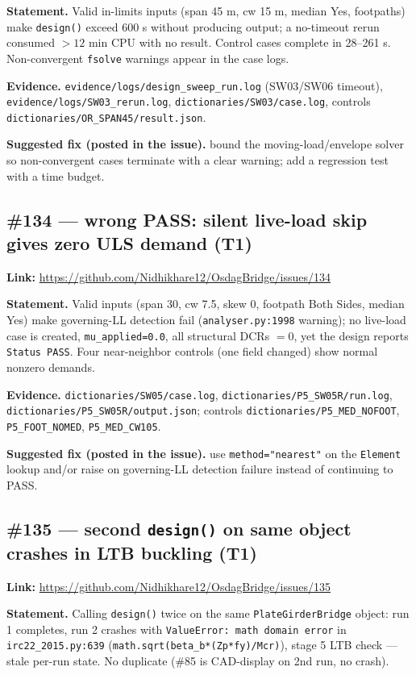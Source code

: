 \textbf{Statement.} Valid in-limits inputs (span 45 m, cw 15 m, median Yes, footpaths) make \texttt{design()} exceed 600 s without producing output; a no-timeout rerun consumed $>12$ min CPU with no result. Control cases complete in 28--261 s. Non-convergent \texttt{fsolve} warnings appear in the case logs.

\textbf{Evidence.} \texttt{evidence/logs/design\_sweep\_run.log} (SW03/SW06 timeout), \texttt{evidence/logs/SW03\_rerun.log}, \texttt{dictionaries/SW03/case.log}, controls \texttt{dictionaries/OR\_SPAN45/result.json}.

\textbf{Suggested fix (posted in the issue).} bound the moving-load/envelope solver so non-convergent cases terminate with a clear warning; add a regression test with a time budget.

\subsection{\#134 --- wrong PASS: silent live-load skip gives zero ULS demand (T1)}
\textbf{Link:} \url{https://github.com/Nidhikhare12/OsdagBridge/issues/134}

\textbf{Statement.} Valid inputs (span 30, cw 7.5, skew 0, footpath Both Sides, median Yes) make governing-LL detection fail (\texttt{analyser.py:1998} warning); no live-load case is created, \texttt{mu\_applied=0.0}, all structural DCRs $=0$, yet the design reports \texttt{Status PASS}. Four near-neighbor controls (one field changed) show normal nonzero demands.

\textbf{Evidence.} \texttt{dictionaries/SW05/case.log}, \texttt{dictionaries/P5\_SW05R/run.log}, \texttt{dictionaries/P5\_SW05R/output.json}; controls \texttt{dictionaries/P5\_MED\_NOFOOT}, \texttt{P5\_FOOT\_NOMED}, \texttt{P5\_MED\_CW105}.

\textbf{Suggested fix (posted in the issue).} use \texttt{method="nearest"} on the \texttt{Element} lookup and/or raise on governing-LL detection failure instead of continuing to PASS.

\subsection{\#135 --- second \texttt{design()} on same object crashes in LTB buckling (T1)}
\textbf{Link:} \url{https://github.com/Nidhikhare12/OsdagBridge/issues/135}

\textbf{Statement.} Calling \texttt{design()} twice on the same \texttt{PlateGirderBridge} object: run 1 completes, run 2 crashes with \texttt{ValueError: math domain error} in \texttt{irc22\_2015.py:639} (\texttt{math.sqrt(beta\_b*(Zp*fy)/Mcr)}), stage 5 LTB check — stale per-run state. No duplicate (\#85 is CAD-display on 2nd run, no crash).

